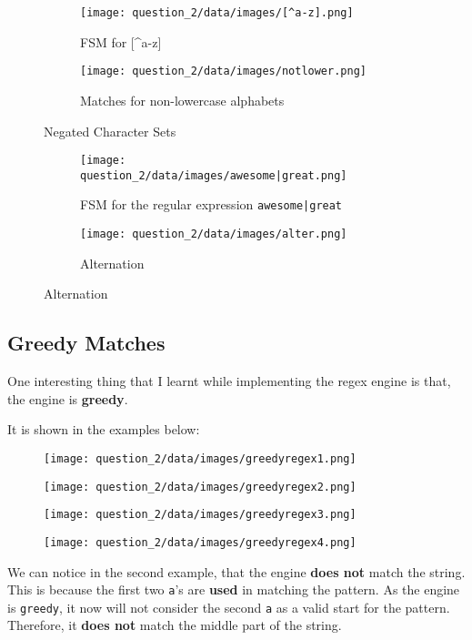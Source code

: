 \documentclass[12pt]{report}
\begin{document}
\begin{figure}[H]
    \centering
    \begin{subfigure}{0.49\textwidth}
        \texttt{[image: question\_2/data/images/[^a-z].png]}
        \caption{FSM for [\textasciicircum a-z]}
    \end{subfigure}
    \begin{subfigure}{0.49\textwidth}
        \texttt{[image: question\_2/data/images/notlower.png]}
        \caption{Matches for non-lowercase alphabets}
    \end{subfigure}
    \caption{Negated Character Sets}
\end{figure}

\begin{figure}[H]
    \centering
    \begin{subfigure}{0.7\textwidth}
        \texttt{[image: question\_2/data/images/awesome|great.png]}
        \caption{FSM for the regular expression \texttt{awesome|great}}
    \end{subfigure}
    \begin{subfigure}{0.7\textwidth}
        \texttt{[image: question\_2/data/images/alter.png]}
        \caption{Alternation}
    \end{subfigure}
\end{figure}
\subsection{Greedy Matches}

One interesting thing that I learnt while implementing the regex engine is that, the engine is \textbf{greedy}.

It is shown in the examples below:

\begin{figure}[H]
    \centering
    \texttt{[image: question\_2/data/images/greedyregex1.png]}
\end{figure}
\begin{figure}[H]
    \centering
    \texttt{[image: question\_2/data/images/greedyregex2.png]}
\end{figure}
\begin{figure}[H]
    \centering
    \texttt{[image: question\_2/data/images/greedyregex3.png]}
\end{figure}
\begin{figure}[H]
    \centering
    \texttt{[image: question\_2/data/images/greedyregex4.png]}
\end{figure}

We can notice in the second example, that the engine \textbf{does not} match the string. This is because the first two \texttt{a}'s are \textbf{used} in matching the pattern. As the engine is \texttt{greedy}, it now will not consider the second \texttt{a} as a valid start for the pattern. Therefore, it \textbf{does not} match the middle part of the string.
\end{document}
